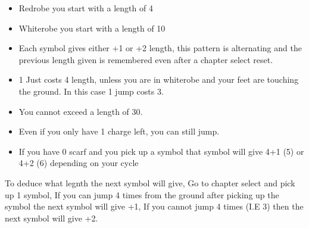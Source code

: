\begin{itemize}
    \item Redrobe you start with a length of 4 
    \item Whiterobe you start with a length of 10
    \item Each symbol gives either +1 or +2 length, this pattern is alternating and the previous length given is remembered even after a chapter select reset.
    \item 1 Just costs 4 length, unless you are in whiterobe and your feet are touching the ground. In this case 1 jump costs 3.
    \item You cannot exceed a length of 30.
    \item Even if you only have 1 charge left, you can still jump.
    \item If you have 0 scarf and you pick up a symbol that symbol will give 4+1 (5) or 4+2 (6) depending on your cycle
\end{itemize}
To deduce what legnth the next symbol will give, Go to chapter select and pick up 1 symbol, If you can jump 4 times
from the ground after picking up the symbol the next symbol will give +1, If you cannot jump 4 times (I.E 3)
then the next symbol will give +2.
\begin{table}[h]
\centering
{}
\caption{Length of scarf after each symbol lookup table\autocite{winds_speedrun_guide}}
\label{tab:symbols-robes}
\end{table}

